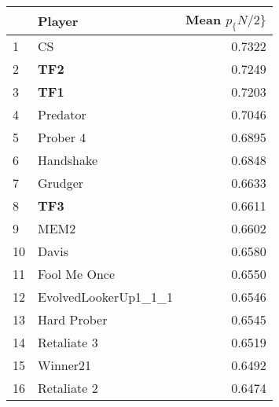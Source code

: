\begin{tabular}{llr}
\toprule
{} &                Player &  Mean $p_\{N/2\}$ \\
\midrule
1  &                    CS &          0.7322 \\
2  &                   \textbf{TF2} &          0.7249 \\
3  &                   \textbf{TF1} &          0.7203 \\
4  &              Predator &          0.7046 \\
5  &              Prober 4 &          0.6895 \\
6  &             Handshake &          0.6848 \\
7  &               Grudger &          0.6633 \\
8  &                   \textbf{TF3} &          0.6611 \\
9  &                  MEM2 &          0.6602 \\
10 &                 Davis &          0.6580 \\
11 &          Fool Me Once &          0.6550 \\
12 &  EvolvedLookerUp1\_1\_1 &          0.6546 \\
13 &           Hard Prober &          0.6545 \\
14 &           Retaliate 3 &          0.6519 \\
15 &              Winner21 &          0.6492 \\
16 &           Retaliate 2 &          0.6474 \\
\bottomrule
\end{tabular}
